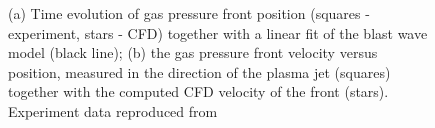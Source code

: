 \documentclass[a4paper]{iacas}%
\begin{document}
\begin{figure}[h]
	\caption{(a) Time evolution of gas pressure front position (squares - experiment, stars - CFD) together with a linear fit of the blast wave model (black line); (b) the gas pressure front velocity versus position, measured in the direction of the plasma jet (squares) together with the computed CFD velocity of the front (stars). Experiment data reproduced from \cite{KR}}
	\label{fig:model_blast}
\end{figure}
\end{document}
